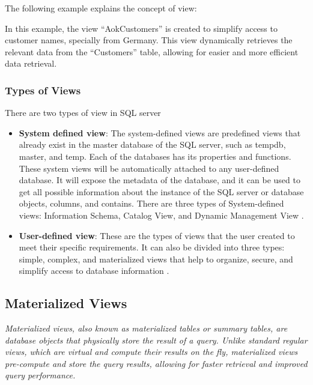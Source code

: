 The following example explains the concept of view:



 In this example, the view ``AokCustomers'' is created to simplify access to customer names, specially from Germany. This view dynamically retrieves the relevant data from the ``Customers'' table, allowing for easier and more efficient data retrieval.
 
\subsubsection{Types of Views}

There are two types of view in SQL server
\begin{itemize}
    \item \textbf{System defined view}: The system-defined views are predefined views that already exist in the master database of the SQL server, such as tempdb, master, and temp. Each of the databases has its properties and functions. These system views will be automatically attached to any user-defined database. It will expose the metadata of the database, and it can be used to get all possible information about the instance of the SQL server or database objects, columns, and contains. There are three types of System-defined views: Information Schema, Catalog View, and Dynamic Management View \cite{chauhan-2024}.
    \item \textbf{User-defined view}: These are the types of views that the user created to meet their specific requirements. It can also be divided into three types: simple, complex, and materialized views that help to organize, secure, and simplify access to database information \cite{javapoint-author-2024}.
\end{itemize}
   
\subsection{Materialized Views}\label{term:materialized_views}
\noindent\textit{Materialized views, also known as materialized tables or summary tables, are database objects that physically store the result of a query. Unlike standard regular views, which are virtual and compute their results on the fly, materialized views pre-compute and store the query results, allowing for faster retrieval and improved query performance\cite{Design_Patterns-Fuad_Efendi-2024}.} \vspace{.3cm}

